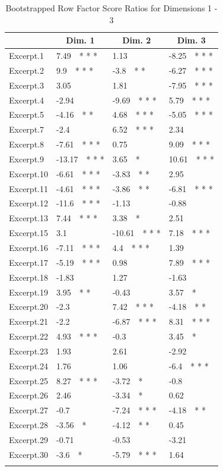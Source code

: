 \documentclass[
]{article}
\begin{document}
\begin{table}[tbp]

\begin{center}
\begin{threeparttable}

\caption{\label{tab:Q.booti.table}Bootstrapped Row Factor Score Ratios for Dimensions 1 - 3}

\begin{tabular}{llll}
\toprule
 & \multicolumn{1}{c}{Dim.  1} & \multicolumn{1}{c}{Dim.  2} & \multicolumn{1}{c}{Dim.  3}\\
\midrule
Excerpt.1 & 7.49\ \ * * * & 1.13 & -8.25\ \ * * *\\
Excerpt.2 & 9.9\ \ * * * & -3.8\ \ * * & -6.27\ \ * * *\\
Excerpt.3 & 3.05 & 1.81 & -7.95\ \ * * *\\
Excerpt.4 & -2.94 & -9.69\ \ * * * & 5.79\ \ * * *\\
Excerpt.5 & -4.16\ \ * * & 4.68\ \ * * * & -5.05\ \ * * *\\
Excerpt.7 & -2.4 & 6.52\ \ * * * & 2.34\\
Excerpt.8 & -7.61\ \ * * * & 0.75 & 9.09\ \ * * *\\
Excerpt.9 & -13.17\ \ * * * & 3.65\ \ * & 10.61\ \ * * *\\
Excerpt.10 & -6.61\ \ * * * & -3.83\ \ * * & 2.95\\
Excerpt.11 & -4.61\ \ * * * & -3.86\ \ * * & -6.81\ \ * * *\\
Excerpt.12 & -11.6\ \ * * * & -1.13 & -0.88\\
Excerpt.13 & 7.44\ \ * * * & 3.38\ \ * & 2.51\\
Excerpt.15 & 3.1 & -10.61\ \ * * * & 7.18\ \ * * *\\
Excerpt.16 & -7.11\ \ * * * & 4.4\ \ * * * & 1.39\\
Excerpt.17 & -5.19\ \ * * * & 0.98 & 7.89\ \ * * *\\
Excerpt.18 & -1.83 & 1.27 & -1.63\\
Excerpt.19 & 3.95\ \ * * & -0.43 & 3.57\ \ *\\
Excerpt.20 & -2.3 & 7.42\ \ * * * & -4.18\ \ * *\\
Excerpt.21 & -2.2 & -6.87\ \ * * * & 8.31\ \ * * *\\
Excerpt.22 & 4.93\ \ * * * & -0.3 & 3.45\ \ *\\
Excerpt.23 & 1.93 & 2.61 & -2.92\\
Excerpt.24 & 1.76 & 1.06 & -6.4\ \ * * *\\
Excerpt.25 & 8.27\ \ * * * & -3.72\ \ * & -0.8\\
Excerpt.26 & 2.46 & -3.34\ \ * & 0.62\\
Excerpt.27 & -0.7 & -7.24\ \ * * * & -4.18\ \ * *\\
Excerpt.28 & -3.56\ \ * & -4.12\ \ * * & 0.45\\
Excerpt.29 & -0.71 & -0.53 & -3.21\\
Excerpt.30 & -3.6\ \ * & -5.79\ \ * * * & 1.64\\
\bottomrule
\addlinespace
\end{tabular}


\end{threeparttable}
\end{center}
\end{table}
\end{document}
